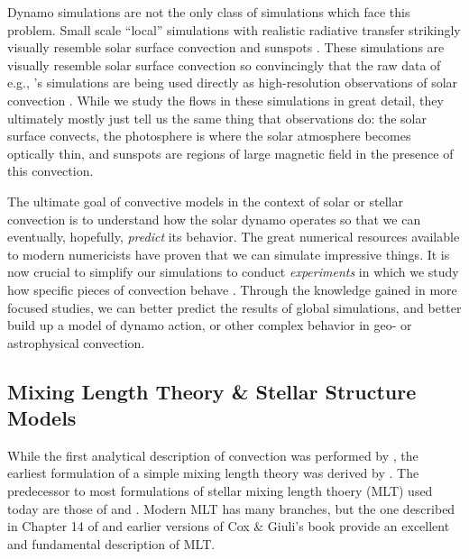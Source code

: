Dynamo simulations are not the only class of simulations which face this problem.
Small scale ``local'' simulations with realistic radiative transfer strikingly visually resemble solar surface convection and sunspots \citep{stein&nordlund1998, rempel&all2009, stein&nordlund2012, rempel2014}.
These simulations are visually resemble solar surface convection so convincingly that the raw data of e.g., \cite{rempel2014}'s simulations are being used directly as high-resolution observations of solar convection \cite[see e.g.,][and others]{vankooten&cranmer2017, shchukina&trujillo2019}.
While we study the flows in these simulations in great detail, they ultimately mostly just tell us the same thing that observations do: the solar surface convects, the photosphere is where the solar atmosphere becomes optically thin, and sunspots are regions of large magnetic field in the presence of this convection.

The ultimate goal of convective models in the context of solar or stellar convection is to understand how the solar dynamo operates so that we can eventually, hopefully, \emph{predict} its behavior.
The great numerical resources available to modern numericists have proven that we can simulate impressive things.
It is now crucial to simplify our simulations to conduct \emph{experiments} in which we study how specific pieces of convection behave \citep[such as in the studies of tachocline interactions of][]{wood&brummell2018}.
Through the knowledge gained in more focused studies, we can better predict the results of global simulations, and better build up a model of dynamo action, or other complex behavior in geo- or astrophysical convection.


\subsection{Mixing Length Theory \& Stellar Structure Models}
While the first analytical description of convection was performed by \citet{rayleigh1916}, the earliest formulation of a simple mixing length theory was derived by \citet{prandtl1925}.
The predecessor to most formulations of stellar mixing length thoery (MLT) used today are those of \citet{vitense1953} and \citet{bohm-vitense1958}.
Modern MLT has many branches, but the one described in Chapter 14 of \citet{weiss&all2004} and earlier versions of Cox \& Giuli's book provide an excellent and fundamental description of MLT.

